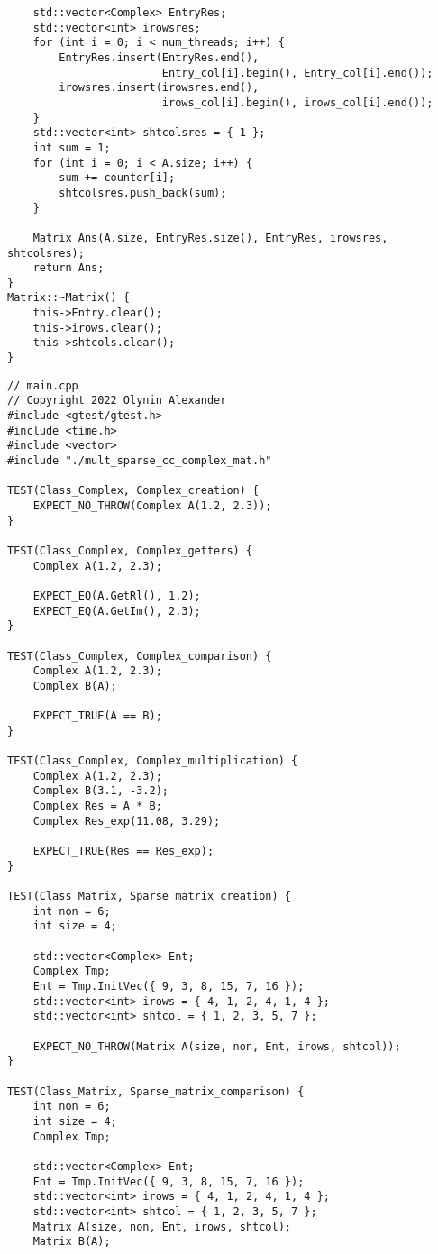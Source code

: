 \documentclass[12pt]{report}
\begin{document}
\begin{lstlisting}
    std::vector<Complex> EntryRes;
    std::vector<int> irowsres;
    for (int i = 0; i < num_threads; i++) {
        EntryRes.insert(EntryRes.end(),
                        Entry_col[i].begin(), Entry_col[i].end());
        irowsres.insert(irowsres.end(),
                        irows_col[i].begin(), irows_col[i].end());
    }
    std::vector<int> shtcolsres = { 1 };
    int sum = 1;
    for (int i = 0; i < A.size; i++) {
        sum += counter[i];
        shtcolsres.push_back(sum);
    }

    Matrix Ans(A.size, EntryRes.size(), EntryRes, irowsres, shtcolsres);
    return Ans;
}
Matrix::~Matrix() {
    this->Entry.clear();
    this->irows.clear();
    this->shtcols.clear();
}

\end{lstlisting}

\begin{lstlisting}
// main.cpp
// Copyright 2022 Olynin Alexander
#include <gtest/gtest.h>
#include <time.h>
#include <vector>
#include "./mult_sparse_cc_complex_mat.h"

TEST(Class_Complex, Complex_creation) {
    EXPECT_NO_THROW(Complex A(1.2, 2.3));
}

TEST(Class_Complex, Complex_getters) {
    Complex A(1.2, 2.3);

    EXPECT_EQ(A.GetRl(), 1.2);
    EXPECT_EQ(A.GetIm(), 2.3);
}

TEST(Class_Complex, Complex_comparison) {
    Complex A(1.2, 2.3);
    Complex B(A);

    EXPECT_TRUE(A == B);
}

TEST(Class_Complex, Complex_multiplication) {
    Complex A(1.2, 2.3);
    Complex B(3.1, -3.2);
    Complex Res = A * B;
    Complex Res_exp(11.08, 3.29);

    EXPECT_TRUE(Res == Res_exp);
}

TEST(Class_Matrix, Sparse_matrix_creation) {
    int non = 6;
    int size = 4;

    std::vector<Complex> Ent;
    Complex Tmp;
    Ent = Tmp.InitVec({ 9, 3, 8, 15, 7, 16 });
    std::vector<int> irows = { 4, 1, 2, 4, 1, 4 };
    std::vector<int> shtcol = { 1, 2, 3, 5, 7 };

    EXPECT_NO_THROW(Matrix A(size, non, Ent, irows, shtcol));
}

TEST(Class_Matrix, Sparse_matrix_comparison) {
    int non = 6;
    int size = 4;
    Complex Tmp;

    std::vector<Complex> Ent;
    Ent = Tmp.InitVec({ 9, 3, 8, 15, 7, 16 });
    std::vector<int> irows = { 4, 1, 2, 4, 1, 4 };
    std::vector<int> shtcol = { 1, 2, 3, 5, 7 };
    Matrix A(size, non, Ent, irows, shtcol);
    Matrix B(A);


\end{lstlisting}
\end{document}

